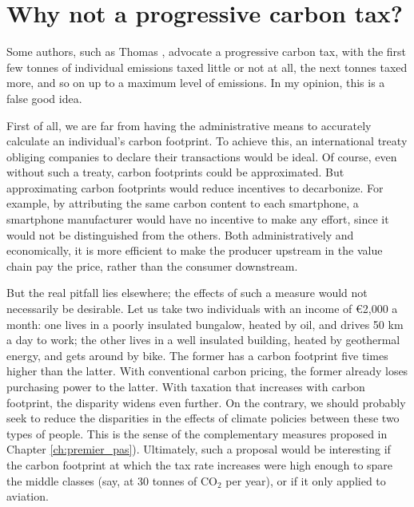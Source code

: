 \documentclass[a5paper,english,openany]{memoir}
\begin{document}
\section*{\normalsize Why not a progressive carbon tax?}\label{q:taxe_progressive}

Some authors, such as Thomas \cite{piketty_capital_2019}, advocate a progressive carbon tax, with the first few tonnes of individual emissions taxed little or not at all, the next tonnes taxed more, and so on up to a maximum level of emissions. In my opinion, this is a false good idea. 

First of all, we are far from having the administrative means to accurately calculate an individual's carbon footprint. To achieve this, an international treaty obliging companies to declare their transactions would be ideal. Of course, even without such a treaty, carbon footprints could be approximated. But approximating carbon footprints would reduce incentives to decarbonize. %
For example, by attributing the same carbon content to each smartphone, a smartphone manufacturer would have no incentive to make any effort, since it would not be distinguished from the others. Both administratively and economically, it is more efficient to make the producer upstream in the value chain pay the price, rather than the consumer downstream. 

But the real pitfall lies elsewhere; %
the effects of such a measure would not necessarily be desirable. Let us %
take two individuals with an income of \euro{}2,000 a month: one lives in a poorly insulated bungalow, heated by oil, and drives 50 km a day to work; the other lives in a well insulated building, heated by geothermal energy, and gets around by bike. The former has a carbon footprint five times higher than the latter. With conventional carbon pricing, the former already loses purchasing power to the latter. With taxation that increases with carbon footprint, the disparity widens even further. On the contrary, we should probably seek to reduce the disparities in the effects of climate policies between these two types of people. This is the sense of the complementary measures proposed in Chapter \ref{ch:premier_pas}). %
Ultimately, such a proposal would be interesting if the carbon footprint at which the tax rate increases were high enough to spare the middle classes (say, at 30 tonnes of CO$_\text{2}$ per year), or if it only applied to aviation. %
\end{document}
